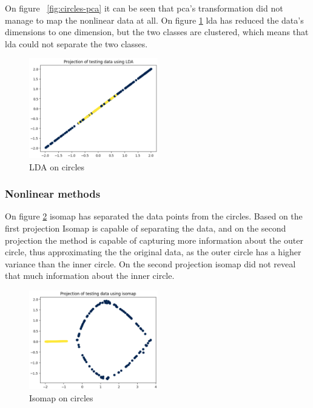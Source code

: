 On figure ~\ref{fig:circles-pca} it can be seen that \gls{pca}'s transformation did not manage to map the nonlinear data at all. On figure \ref{fig:circles-lda} \gls{lda} has reduced the data's dimensions to one dimension, but the two classes are clustered, which means that \gls{lda} could not separate the two classes.

\begin{figure}[htb!]
    \centering
    \includegraphics[width=0.5\textwidth]{figures/theory-example-figures/circles-lda.png}
    \caption{LDA on circles}
    \label{fig:circles-lda}
    \end{figure}
    
\subsubsection{Nonlinear methods}\label{subsubsec:nonlinear-methods-on-circles}
On figure \ref{fig:circles-isomap} \gls{isomap} has separated the data points from the circles. Based on the first projection Isomap is capable of separating the data, and on the second projection the method is capable of capturing more information about the outer circle, thus approximating the the original data, as the outer circle has a higher variance than the inner circle. On the second projection \gls{isomap} did not reveal that much information about the inner circle.
\begin{figure}[htb!]
    \centering
    \includegraphics[width=0.5\textwidth]{figures/theory-example-figures/circles-isomap.png}
    \caption{Isomap on circles}
    \label{fig:circles-isomap}
\end{figure}


